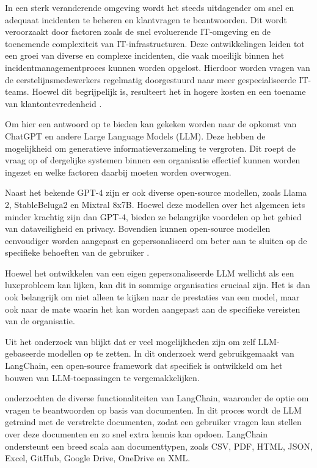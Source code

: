 In een sterk veranderende omgeving wordt het steeds uitdagender om snel en adequaat incidenten te beheren en klantvragen te beantwoorden. Dit wordt veroorzaakt door factoren zoals de snel evoluerende IT-omgeving en de toenemende complexiteit van IT-infrastructuren. Deze ontwikkelingen leiden tot een groei van diverse en complexe incidenten, die vaak moeilijk binnen het incidentmanagementproces kunnen worden opgelost. Hierdoor worden vragen van de eerstelijnsmedewerkers regelmatig doorgestuurd naar meer gespecialiseerde IT-teams. Hoewel dit begrijpelijk is, resulteert het in hogere kosten en een toename van klantontevredenheid \autocite{Schmidt2024}.

Om hier een antwoord op te bieden kan gekeken worden naar de opkomst van ChatGPT en andere Large Language Models (LLM). Deze hebben de mogelijkheid om generatieve informatieverzameling te vergroten. Dit roept de vraag op of dergelijke systemen binnen een organisatie effectief kunnen worden ingezet en welke factoren daarbij moeten worden overwogen.

Naast het bekende GPT-4 zijn er ook diverse open-source modellen, zoals Llama 2, StableBeluga2 en Mixtral 8x7B. Hoewel deze modellen over het algemeen iets minder krachtig zijn dan GPT-4, bieden ze belangrijke voordelen op het gebied van dataveiligheid en privacy. Bovendien kunnen open-source modellen eenvoudiger worden aangepast en gepersonaliseerd om beter aan te sluiten op de specifieke behoeften van de gebruiker \autocite{KernanFreire2024}.

Hoewel het ontwikkelen van een eigen gepersonaliseerde LLM wellicht als een luxeprobleem kan lijken, kan dit in sommige organisaties cruciaal zijn. Het is dan ook belangrijk om niet alleen te kijken naar de prestaties van een model, maar ook naar de mate waarin het kan worden aangepast aan de specifieke vereisten van de organisatie.

Uit het onderzoek van \textcite{Topsakal2023} blijkt dat er veel mogelijkheden zijn om zelf LLM-gebaseerde modellen op te zetten. In dit onderzoek werd gebruikgemaakt van LangChain, een open-source framework dat specifiek is ontwikkeld om het bouwen van LLM-toepassingen te vergemakkelijken.

\textcite{Topsakal2023} onderzochten de diverse functionaliteiten van LangChain, waaronder de optie om vragen te beantwoorden op basis van documenten. In dit proces wordt de LLM getraind met de verstrekte documenten, zodat een gebruiker vragen kan stellen over deze documenten en zo snel extra kennis kan opdoen. LangChain ondersteunt een breed scala aan documenttypen, zoals CSV, PDF, HTML, JSON, Excel, GitHub, Google Drive, OneDrive en XML.

